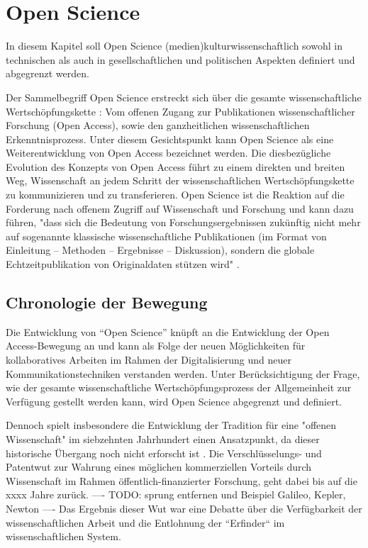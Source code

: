 \section{Open Science}
In diesem Kapitel soll Open Science (medien)kulturwissenschaftlich sowohl in technischen als auch in gesellschaftlichen und politischen Aspekten definiert und abgegrenzt werden.

Der Sammelbegriff Open Science erstreckt sich über die gesamte wissenschaftliche Wertschöpfungskette \cite{Scheliga_2014}: Vom offenen Zugang zur Publikationen wissenschaftlicher Forschung (Open Access), sowie den ganzheitlichen wissenschaftlichen Erkenntnisprozess. Unter diesem Gesichtspunkt kann Open Science als eine Weiterentwicklung von Open Access bezeichnet werden. Die diesbezügliche Evolution des Konzepts von Open Access führt zu einem direkten und breiten Weg, Wissenschaft an jedem Schritt der wissenschaftlichen Wertschöpfungskette zu kommunizieren und zu transferieren. Open Science ist die Reaktion auf die Forderung nach offenem Zugriff auf Wissenschaft und Forschung und kann dazu führen, "dass sich die Bedeutung von Forschungsergebnissen zukünftig nicht mehr auf sogenannte klassische wissenschaftliche Publikationen (im Format von Einleitung – Methoden – Ergebnisse – Diskussion), sondern die globale Echtzeitpublikation von Originaldaten stützen wird" \cite{Stengel_2013}.

\subsection{Chronologie der Bewegung}

Die Entwicklung von “Open Science” knüpft an die Entwicklung der Open Access-Bewegung an und kann als Folge der neuen Möglichkeiten für kollaboratives Arbeiten im Rahmen der Digitalisierung und neuer Kommunikationstechniken verstanden werden. Unter Berücksichtigung der Frage, wie der gesamte wissenschaftliche Wertschöpfungsprozess der Allgemeinheit zur Verfügung gestellt werden kann, wird Open Science abgegrenzt und definiert. 

Dennoch spielt insbesondere die Entwicklung der Tradition für eine "offenen Wissenschaft" im siebzehnten Jahrhundert einen Ansatzpunkt, da dieser historische Übergang noch nicht erforscht ist \cite{CREATe_2014}. Die Verschlüsselungs- und Patentwut zur Wahrung eines möglichen kommerziellen Vorteils durch Wissenschaft im Rahmen öffentlich-finanzierter Forschung, geht dabei bis auf die xxxx Jahre zurück. ---- TODO: sprung entfernen und Beispiel Galileo, Kepler, Newton ----  Das Ergebnis dieser Wut war eine Debatte über die Verfügbarkeit der wissenschaftlichen Arbeit und die Entlohnung der “Erfinder“ im wissenschaftlichen System. 

